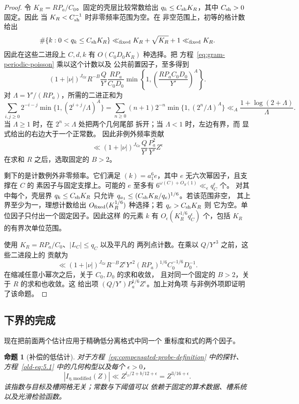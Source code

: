 \documentclass[11pt,a4paper]{article}
\numberwithin{equation}{section}
\numberwithin{figure}{section}
\newtheorem{proposition}[theorem]{命题}
\theoremstyle{definition}
\theoremstyle{remark}
\begin{document}
\begin{proof}
令 $K_R=RP_a/C_0$。固定的壳层比较常数给出
$q_k\le C_{\rm sh}K_R$，其中 $C_{\rm sh}>0$ 固定。因此
当 $K_R<C_{\rm sh}^{-1}$ 时非零频率范围为空。在
非空范围上，初等的格计数给出
\[
 \#\{k:0<q_k\le C_{\rm sh}K_R\}
       \ll_{\rm fixed}K_R+\sqrt{K_R}+1\ll_{\rm fixed}K_R.
\]
因此在这些二进段上 $C,d,k$ 有 $O(C_0D_0K_R)$ 种选择。把
方程~\eqref{eq:gram-periodic-poisson} 乘以这个计数以及
公共前置因子，至多得到
\[
 (1+|\nu|)^{J_{\mathrm{Gr}}} R^{-B}\frac Q{Y'}\frac{RP_a}{C_0D_0}
       \min\left\{1,\left(\frac{RP_aC_0D_0}{Y'}\right)^A\right\}.
\]
对 $\Lambda=Y'/(RP_a)$，所需的二进正和为
\[
 \sum_{i,j\ge0}2^{-i-j}\min\{1,(2^{i+j}/\Lambda)^A\}
 =\sum_{n\ge0}(n+1)2^{-n}\min\{1,(2^n/\Lambda)^A\}
 \ll_A\frac{1+\log(2+\Lambda)}{\Lambda}.
\]
当 $\Lambda\ge1$ 时，在 $2^n\asymp\Lambda$ 处把两个几何尾部
拆开；当 $\Lambda<1$ 时，左边有界，而
显式给出的右边大于一个正常数。
因此非例外频率贡献
\[
 \ll (1+|\nu|)^{J_{\mathrm{Gr}}}\frac Q{Y'}\frac{P_a^2}{Y'}Z^\epsilon
\]
在求和 $R$ 之后，选取固定的 $B>2$。

剩下的是计数例外非零频率。它们满足
$(k)=a_1^6e$，其中 $e$ 无六次幂因子，且支撑在 $C$ 的
素因子与固定支撑上。可能的 $e$ 至多有
$6^{\omega(C)+O_S(1)}\ll_\epsilon q_C^\epsilon$ 个。
对其中每个，壳层界 $q_k\le C_{\rm sh}K_R$ 只允许
$q_{a_1}\le(C_{\rm sh}K_R/q_e)^{1/6}$。若该范围非空，
其上界至少为一，理想计数给出
$O_{\rm fixed}(K_R^{1/6})$ 种选择；若 $q_e>C_{\rm sh}K_R$ 则
它为空。单位因子只付出一个固定因子。因此这样
的元素 $k$ 有 $O_\epsilon(K_R^{1/6}q_C^\epsilon)$ 个，包括
$K_R$ 的有界次单位范围。

使用 $K_R=RP_a/C_0$、$|L_C|\le q_C$ 以及平凡的
两列点计数。在乘以 $Q/Y'^3$ 之前，这些二进段上的
贡献为
\[
 \ll (1+|\nu|)^{J_{\mathrm{Gr}}} R^{-B}Z^\epsilon
       Y'^2(RP_a)^{1/6}C_0^{-1/6}D_0^{-1}.
\]
在缩减任意小幂次之后，关于 $C_0,D_0$ 的求和收敛，
且对同一个固定的 $B>2$，关于 $R$ 的求和也收敛。这
给出项 $(Q/Y')P_a^{1/6}Z^\epsilon$。加上对角项
与非例外项即证明了该命题。
\end{proof}

\subsection{下界的完成}

现在把前面两个估计应用于精确低分离格式中同一个
重标度和式的两个因子。

\begin{proposition}[补偿的低估计]\label{prop:probe-low}
对于方程~\eqref{eq:compensated-probe-definition} 中的探针、
方程~\eqref{old-eq:5.1} 中的几何构型以及每个
$\epsilon>0$，
\begin{equation}
 |I_{\eta,\mathrm{modified}}(Z)|
       \ll Z^{l_x/2+b/12+\epsilon}=Z^{3/16+\epsilon}.
 \label{old-eq:5.10}
\end{equation}
该指数与目标及槽网格无关；常数与下阈值可以
依赖于固定的算术数据、槽系统以及光滑检验函数。
\end{proposition}
\end{document}
